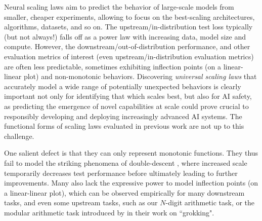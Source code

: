 \documentclass{article} %
\begin{document}
Neural scaling laws \citep{cortes1994learning,2017arXiv171200409H,DBLP:journals/corr/abs-1909-12673,icm2020arXiv200108361K,DBLP:journals/corr/abs-2106-04560,abnar2021exploring,Alabdulmohsi2022revisiting, brown2020language, bahri2021explaining} aim to predict the behavior of large-scale models from smaller, cheaper experiments, allowing to focus on the best-scaling architectures, algorithms, datasets, and so on. The upstream/in-distribution test loss typically (but not always!) falls off  as a power law with increasing  data, model size and compute. However, the downstream/out-of-distribution performance, and other evaluation metrics of interest (even upstream/in-distribution evaluation metrics) %
are often less predictable, sometimes exhibiting inflection points (on a linear-linear plot) and non-monotonic behaviors. Discovering {\it universal  scaling laws} that accurately model a wide range of potentially unexpected behaviors is clearly important not only for identifying that which scales best, but also for AI safety, as predicting the emergence of novel capabilities at scale could prove crucial to responsibly developing and deploying increasingly advanced AI systems. %
The functional forms of scaling laws evaluated in previous work are not up to this challenge.





One salient defect is that they can only represent monotonic functions.
They thus fail to model the striking phenomena of double-descent \citep{nakkiran2021deep}, where increased scale temporarily decreases test performance before ultimately leading to further improvements. %
Many also lack the expressive power to model inflection points (on a linear-linear plot), which can be observed empirically for many downstream tasks, and even some upstream tasks, such as our $N$-digit arithmetic task, or the modular arithmetic task introduced by \citet{power2022grokking} in their work on ``grokking".
\end{document}
